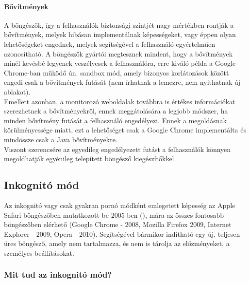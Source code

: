 \paragraph{Bővítmények} %
\label{par:bővítmények_security}
A böngészők, így a felhasználók biztonsági szintjét nagy mértékben rontják a bővítmények, melyek hibásan implementálnak képességeket, vagy éppen olyan lehetőségeket engednek, melyek segítségével a felhasználó egyértelműen azonosítható. A böngészők gyártói megtesznek mindent, hogy a bővítmények minél kevésbé legyenek veszélyesek a felhasználóra, erre kiváló példa a Google Chrome-ban működő ún. sandbox mód, amely bizonyos korlátozások között engedi csak a bővítmények futását (nem írhatnak a lemezre, nem nyithatnak új ablakot). \cite{chromium_sandbox}\hfill\\
Emellett azonban, a monitorozó weboldalak továbbra is értékes információkat szerezhetnek a bővítményekről, ennek meggátolására a legjobb módszer, ha minden bővítmény futását a felhasználó engedélyezi. Ennek a megoldásnak körülményessége miatt, ezt a lehetőséget csak a Google Chrome implementálta és mindössze csak a Java bővítményekre. \cite{chrome_disabled_java}\hfill\\
Viszont szerencsére az egyedileg engedélyezett futást a felhasználók könnyen megoldhatják egyénileg telepített böngésző kiegészítőkkel.


\subsection{Inkognitó mód} %

Az inkognitó vagy csak gyakran pornó módként emlegetett képesség az Apple Safari böngészőben mutatkozott be 2005-ben (\cite{safari_pornmode}), mára az összes fontosabb böngészőben elérhető (Google Chrome - 2008, Mozilla Firefox 2009, Internet Explorer - 2009, Opera - 2010). Segítségével bármikor indítható egy új, teljesen üres böngésző, amely nem tartalmazza, és nem is tárolja az előzményeket, a személyes beállításokat.\hfill\\

\subsubsection{Mit tud az inkognitó mód?} %

